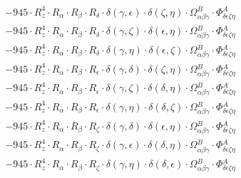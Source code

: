 \documentclass{article}
\begin{document}
\begin{equation}
\begin{array}{c}
 \\[0.2em] 		 - 945 \cdot R_{z}^{4} \cdot R_{\alpha{}} \cdot R_{\beta{}} \cdot R_{\delta{}} \cdot \delta{}\left(\gamma{}, \epsilon{}\right) \cdot \delta{}\left(\zeta{}, \eta{}\right) \cdot \Omega{}^{B}_{\alpha{}\beta{}\gamma{}} \cdot \Phi{}^{A}_{\delta{}\epsilon{}\zeta{}\eta{}} 
 \\[0.2em] 		 - 945 \cdot R_{z}^{4} \cdot R_{\alpha{}} \cdot R_{\beta{}} \cdot R_{\delta{}} \cdot \delta{}\left(\gamma{}, \zeta{}\right) \cdot \delta{}\left(\epsilon{}, \eta{}\right) \cdot \Omega{}^{B}_{\alpha{}\beta{}\gamma{}} \cdot \Phi{}^{A}_{\delta{}\epsilon{}\zeta{}\eta{}} 
 \\[0.2em] 		 - 945 \cdot R_{z}^{4} \cdot R_{\alpha{}} \cdot R_{\beta{}} \cdot R_{\delta{}} \cdot \delta{}\left(\gamma{}, \eta{}\right) \cdot \delta{}\left(\epsilon{}, \zeta{}\right) \cdot \Omega{}^{B}_{\alpha{}\beta{}\gamma{}} \cdot \Phi{}^{A}_{\delta{}\epsilon{}\zeta{}\eta{}} 
 \\[0.2em] 		 - 945 \cdot R_{z}^{4} \cdot R_{\alpha{}} \cdot R_{\beta{}} \cdot R_{\epsilon{}} \cdot \delta{}\left(\gamma{}, \delta{}\right) \cdot \delta{}\left(\zeta{}, \eta{}\right) \cdot \Omega{}^{B}_{\alpha{}\beta{}\gamma{}} \cdot \Phi{}^{A}_{\delta{}\epsilon{}\zeta{}\eta{}} 
 \\[0.2em] 		 - 945 \cdot R_{z}^{4} \cdot R_{\alpha{}} \cdot R_{\beta{}} \cdot R_{\epsilon{}} \cdot \delta{}\left(\gamma{}, \zeta{}\right) \cdot \delta{}\left(\delta{}, \eta{}\right) \cdot \Omega{}^{B}_{\alpha{}\beta{}\gamma{}} \cdot \Phi{}^{A}_{\delta{}\epsilon{}\zeta{}\eta{}} 
 \\[0.2em] 		 - 945 \cdot R_{z}^{4} \cdot R_{\alpha{}} \cdot R_{\beta{}} \cdot R_{\epsilon{}} \cdot \delta{}\left(\gamma{}, \eta{}\right) \cdot \delta{}\left(\delta{}, \zeta{}\right) \cdot \Omega{}^{B}_{\alpha{}\beta{}\gamma{}} \cdot \Phi{}^{A}_{\delta{}\epsilon{}\zeta{}\eta{}} 
 \\[0.2em] 		 - 945 \cdot R_{z}^{4} \cdot R_{\alpha{}} \cdot R_{\beta{}} \cdot R_{\zeta{}} \cdot \delta{}\left(\gamma{}, \delta{}\right) \cdot \delta{}\left(\epsilon{}, \eta{}\right) \cdot \Omega{}^{B}_{\alpha{}\beta{}\gamma{}} \cdot \Phi{}^{A}_{\delta{}\epsilon{}\zeta{}\eta{}} 
 \\[0.2em] 		 - 945 \cdot R_{z}^{4} \cdot R_{\alpha{}} \cdot R_{\beta{}} \cdot R_{\zeta{}} \cdot \delta{}\left(\gamma{}, \epsilon{}\right) \cdot \delta{}\left(\delta{}, \eta{}\right) \cdot \Omega{}^{B}_{\alpha{}\beta{}\gamma{}} \cdot \Phi{}^{A}_{\delta{}\epsilon{}\zeta{}\eta{}} 
 \\[0.2em] 		 - 945 \cdot R_{z}^{4} \cdot R_{\alpha{}} \cdot R_{\beta{}} \cdot R_{\zeta{}} \cdot \delta{}\left(\gamma{}, \eta{}\right) \cdot \delta{}\left(\delta{}, \epsilon{}\right) \cdot \Omega{}^{B}_{\alpha{}\beta{}\gamma{}} \cdot \Phi{}^{A}_{\delta{}\epsilon{}\zeta{}\eta{}} 

\end{array}
\end{equation}
\end{document}
